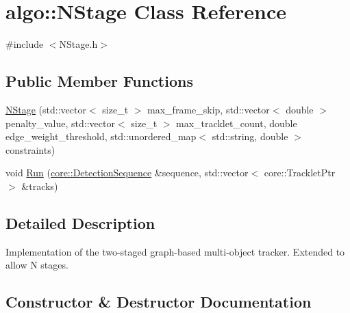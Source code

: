 \hypertarget{classalgo_1_1NStage}{}\section{algo\+:\+:N\+Stage Class Reference}
\label{classalgo_1_1NStage}


{\ttfamily \#include $<$N\+Stage.\+h$>$}

\subsection*{Public Member Functions}
\begin{DoxyCompactItemize}
\item 
\hyperlink{classalgo_1_1NStage_a65baad453fa371f18be02fd19e695ea1}{N\+Stage} (std\+::vector$<$ size\+\_\+t $>$ max\+\_\+frame\+\_\+skip, std\+::vector$<$ double $>$ penalty\+\_\+value, std\+::vector$<$ size\+\_\+t $>$ max\+\_\+tracklet\+\_\+count, double edge\+\_\+weight\+\_\+threshold, std\+::unordered\+\_\+map$<$ std\+::string, double $>$ constraints)
\item 
void \hyperlink{classalgo_1_1NStage_a8c25c9c9796db048bb4b55d7a603b00b}{Run} (\hyperlink{classcore_1_1DetectionSequence}{core\+::\+Detection\+Sequence} \&sequence, std\+::vector$<$ core\+::\+Tracklet\+Ptr $>$ \&tracks)
\end{DoxyCompactItemize}


\subsection{Detailed Description}
Implementation of the two-\/staged graph-\/based multi-\/object tracker. Extended to allow N stages. 

\subsection{Constructor \& Destructor Documentation}
